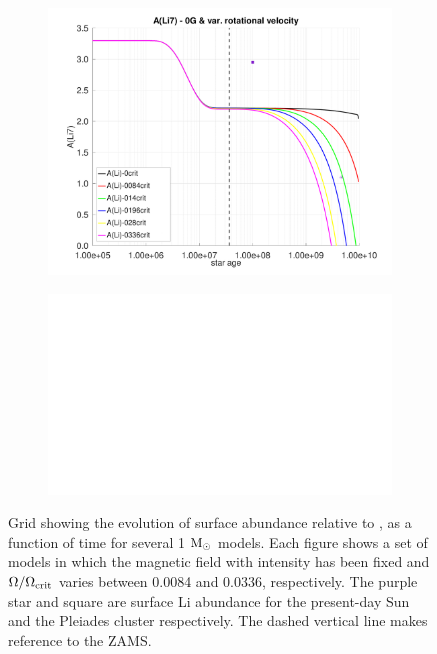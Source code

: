 \documentclass[fleqn,usenatbib]{mnras}
\begin{document}
\begin{figure}
\begin{subfigure}[h]{0.47\textwidth}
    \includegraphics[trim = 25mm 10mm 15mm 10mm, clip,width=\textwidth]{figures/paper1/li_var_vel_0_0g.pdf}
    \label{fig:subim13}
    \end{subfigure}
    \begin{subfigure}[h]{0.47\textwidth}
    \includegraphics[width=\textwidth]{figures/blank.eps}
    \label{fig:subim14}
    \end{subfigure}

\caption{Grid showing the evolution of surface  abundance relative to , as a function of time for several 1 $\mathrm{M}_\odot$ models. Each figure shows a set of models in which the magnetic field with intensity has been fixed and $\Omega / \Omega_{\mathrm{crit}}$ varies between 0.0084 and 0.0336, respectively. The purple star and square are surface Li abundance for the present-day Sun \citep{Asplund2009} and the Pleiades cluster \citep{Sestito2005} respectively. The dashed vertical line makes reference to the ZAMS.}
\label{fig:grid_li_var_vel}
\end{figure}
\par
\end{document}
